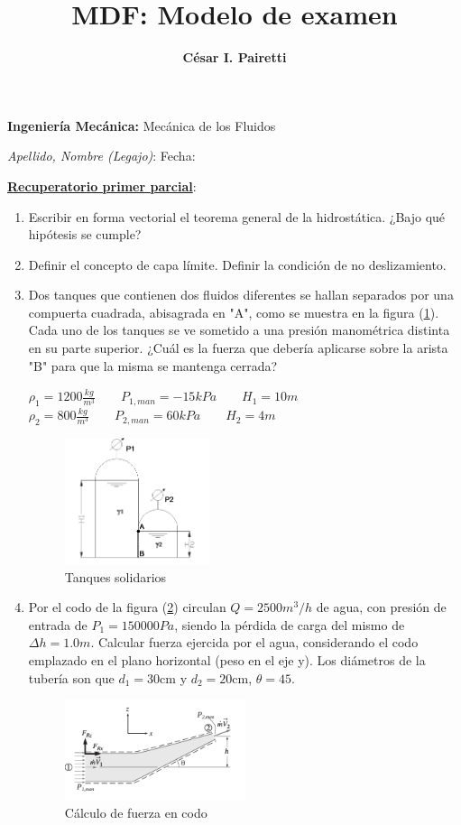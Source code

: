 \documentclass[a4paper,10pt]{article}
\title{MDF: Modelo de examen}
\author{{{\bf César I. Pairetti}}}
\newcommand{\MDF}
{
\begin{center}
{\large {\bf Ingeniería Mecánica:} Mecánica de los Fluidos}
\end{center}
\textit{Apellido, Nombre (Legajo)}: \hskip 8.cm Fecha:
\vspace{0.2cm}
}
\begin{document}
\MDF

\noindent \underline{\textbf{Recuperatorio primer parcial}}:

\begin{enumerate}
\item Escribir en forma vectorial el teorema general de la hidrostática. ¿Bajo qué hipótesis se cumple?
\item Definir el concepto de capa límite. Definir la condición de no deslizamiento.
\item Dos tanques que contienen dos fluidos diferentes se hallan separados por
una compuerta cuadrada, abisagrada en "A", como se muestra en la figura (\ref{fig:tanques}).
Cada uno de los tanques se ve sometido a una presión manométrica distinta en su
parte superior. ¿Cuál es la fuerza que debería aplicarse sobre la arista "B" para que la misma se mantenga cerrada?
\begin{center}
  $\rho_1 = 1200 \frac{kg}{m^3} \qquad P_{1,man} = -15 kPa \qquad H_1 = 10 m $\\
  $\rho_2 = 800 \frac{kg}{m^3} \qquad P_{2,man} = 60 kPa \qquad H_2 = 4 m$
\end{center}
\begin{figure}[h!!!!]
  \centering
  \includegraphics[width=0.4\textwidth]{tanques_solidarios.png}
  \caption{Tanques solidarios}
  \label{fig:tanques}
\end{figure} 
\item Por el codo de la figura (\ref{fig:codo}) circulan $Q=2500 m^3/h$ de agua, con presión de entrada de $P_1 = 150000 Pa $, siendo la pérdida de carga del mismo  de $\Delta h = 1.0m$. Calcular fuerza ejercida por el agua, considerando el codo emplazado en el plano horizontal (peso en el eje y). Los diámetros de la tubería son que $d_1 = 30$cm y $d_2 = 20$cm, $\theta = 45$. 
      \vspace{0.5cm}
      \begin{figure}[h!!]
      \centering
      \includegraphics[width=0.5\textwidth]{codo_cimbala_gral.png}
      \caption{Cálculo de fuerza en codo}
      \label{fig:codo}
      \end{figure}  

\end{enumerate}
\end{document}
